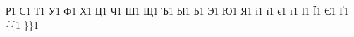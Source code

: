 {	{Р}{{\selectfont{}}}1
	{С}{{\selectfont{}}}1
	{Т}{{\selectfont{}}}1
	{У}{{\selectfont{}}}1
	{Ф}{{\selectfont{}}}1
	{Х}{{\selectfont{}}}1
	{Ц}{{\selectfont{}}}1
	{Ч}{{\selectfont{}}}1
	{Ш}{{\selectfont{}}}1
	{Щ}{{\selectfont{}}}1
	{Ъ}{{\selectfont{}}}1
	{Ы}{{\selectfont{}}}1
	{Ь}{{\selectfont{}}}1
	{Э}{{\selectfont{}}}1
	{Ю}{{\selectfont{}}}1
	{Я}{{\selectfont{}}}1
	{і}{{\selectfont{}}}1
	{ї}{{\selectfont{}}}1
	{є}{{\selectfont{}}}1
	{ґ}{{\selectfont{}}}1
	{І}{{\selectfont{}}}1
	{Ї}{{\selectfont{}}}1
	{Є}{{\selectfont{}}}1
	{Ґ}{{\selectfont{}}}1
	{\{}{{{\color{brackets}\{}}}1 %
	{\}}{{{\color{brackets}\}}}}1 %
}
